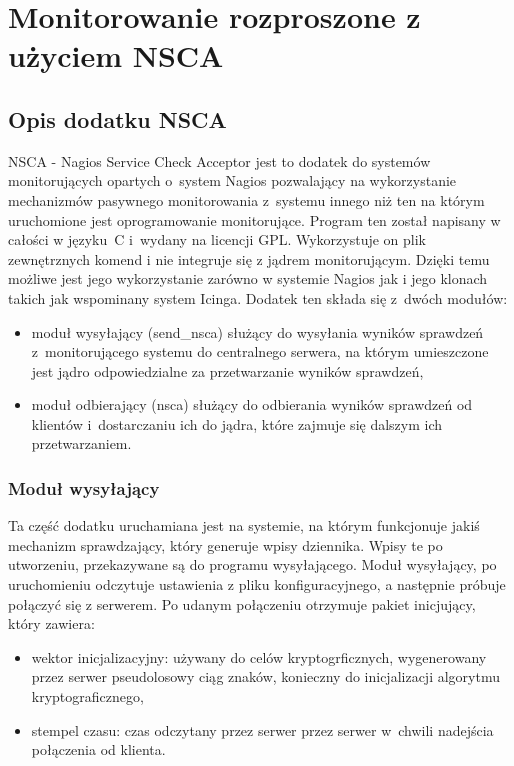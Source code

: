 \chapter{Monitorowanie rozproszone z użyciem NSCA}

\section[Opis dodatku NSCA][Opis dodatku NSCA]{Opis dodatku NSCA}

NSCA - Nagios Service Check Acceptor jest to dodatek do systemów
monitorujących opartych o~system Nagios pozwalający na wykorzystanie
mechanizmów pasywnego monitorowania z~systemu innego niż ten na którym
uruchomione jest oprogramowanie monitorujące. Program ten został
napisany w całości w języku~C i~wydany na licencji GPL. Wykorzystuje
on plik zewnętrznych komend i nie integruje się z jądrem
monitorującym. Dzięki temu możliwe jest jego wykorzystanie zarówno w
systemie Nagios jak i jego klonach takich jak wspominany system
Icinga. Dodatek ten składa się z~dwóch modułów:

\begin{itemize}
\item moduł wysyłający (send\_nsca) służący do wysyłania wyników
  sprawdzeń z~monitorującego systemu do centralnego serwera, na którym
  umieszczone jest jądro odpowiedzialne za przetwarzanie wyników
  sprawdzeń,
\item moduł odbierający (nsca) służący do odbierania wyników sprawdzeń
  od klientów i~dostarczaniu ich do jądra, które zajmuje się dalszym
  ich przetwarzaniem.
\end{itemize}


\subsection[Moduł wysyłający][Moduł wysyłający]{Moduł wysyłający}
\label{subsec:modulWysylajacy}

Ta część dodatku uruchamiana jest na systemie, na którym funkcjonuje
jakiś mechanizm sprawdzający, który generuje wpisy dziennika. Wpisy te
po utworzeniu, przekazywane są do programu wysyłającego. Moduł
wysyłający, po uruchomieniu odczytuje ustawienia z pliku
konfiguracyjnego, a następnie próbuje połączyć się z serwerem. Po udanym
połączeniu otrzymuje pakiet inicjujący, który zawiera:

\begin{itemize}
\item wektor inicjalizacyjny: używany do celów kryptogrficznych,
  wygenerowany przez serwer pseudolosowy ciąg znaków, konieczny do
  inicjalizacji algorytmu kryptograficznego,
\item stempel czasu: czas odczytany przez serwer przez serwer w~chwili
  nadejścia połączenia od klienta.
\end{itemize} 

